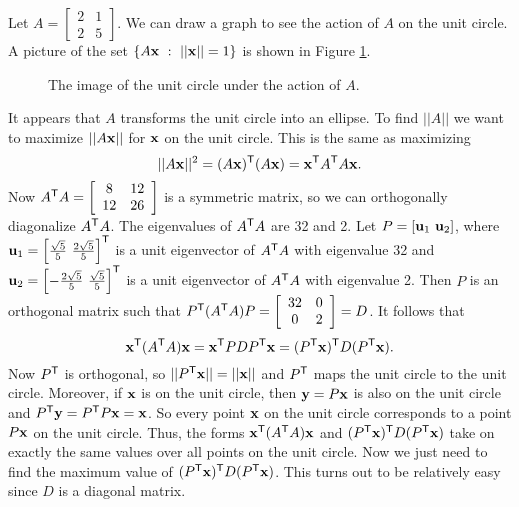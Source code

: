 \begin{example} Let $A = \left[ \begin{array}{cc} 2&1 \\ 2&5 \end{array} \right]$. We can draw a graph to see the action of $A$ on the unit circle. A picture of the set $\{A\mathbf{x} \ : \ ||\mathbf{x}|| = 1\}$ is shown in Figure \ref{F:7_c_Mat_norm1}.
\begin{figure}[h]
\begin{center}
\end{center}
\caption{The image of the unit circle under the action of $A$.}
\label{F:7_c_Mat_norm1}
\end{figure}

It appears that $A$ transforms the unit circle into an ellipse. To find $||A||$ we want to maximize $||A\mathbf{x}||$ for $\mathbf{x}$ on the unit circle. This is the same as maximizing
\[||A\mathbf{x}||^2 = (A\mathbf{x})^{\mathsf{T}}(A\mathbf{x}) = \mathbf{x}^{\mathsf{T}}A^{\mathsf{T}}A\mathbf{x}.\]
Now $A^{\mathsf{T}}A = \left[ \begin{array}{cc} 8&12 \\ 12&26 \end{array} \right]$ is a symmetric matrix, so we can orthogonally diagonalize $A^{\mathsf{T}}A$. The eigenvalues of $A^{\mathsf{T}}A$ are 32 and 2. Let $P = [\mathbf{u}_1 \ \mathbf{u}_2]$, where $\vu_1=\left[ \frac{\sqrt{5}}{5} \ \frac{2\sqrt{5}}{5} \right]^{\tr}$ is a unit eigenvector of $A^{\mathsf{T}}A$ with eigenvalue 32 and $\vu_2=\left[ -\frac{2\sqrt{5}}{5} \ \frac{\sqrt{5}}{5} \right]^{\tr}$ is a unit eigenvector of $A^{\mathsf{T}}A$ with eigenvalue 2. Then $P$ is an orthogonal matrix such that $P^{\mathsf{T}}(A^{\mathsf{T}}A)P = \left[ \begin{array}{cc} 32&0 \\ 0&2 \end{array} \right] = D$. It follows that 
\[\mathbf{x}^{\mathsf{T}} (A^{\mathsf{T}}A)  \mathbf{x} = \mathbf{x}^{\mathsf{T}} PDP^{\mathsf{T}} \mathbf{x} = (P^{\mathsf{T}}\mathbf{x})^{\mathsf{T}} D (P^{\mathsf{T}}\mathbf{x}).\]
Now $P^{\mathsf{T}}$ is orthogonal, so $||P^{\mathsf{T}}\mathbf{x}|| = ||\mathbf{x}||$ and $P^{\mathsf{T}}$ maps the unit circle to the unit circle. Moreover, if $\mathbf{x}$ is on the unit circle, then $\mathbf{y} = P\mathbf{x}$ is also on the unit circle and $P^{\mathsf{T}}\mathbf{y} = P^{\mathsf{T}}P\mathbf{x} = \mathbf{x}$. So every point $\mathbf{x}$ on the unit circle corresponds to a point $P\mathbf{x}$ on the unit circle. Thus, the forms $\mathbf{x}^{\mathsf{T}} (A^{\mathsf{T}}A)  \mathbf{x}$ and $(P^{\mathsf{T}}\mathbf{x})^{\mathsf{T}} D (P^{\mathsf{T}}\mathbf{x})$ take on exactly the same values over all points on the unit circle. Now we just need to find the maximum value of $(P^{\mathsf{T}}\mathbf{x})^{\mathsf{T}} D (P^{\mathsf{T}}\mathbf{x})$. This turns out to be relatively easy since $D$ is a diagonal matrix.


\end{example}
